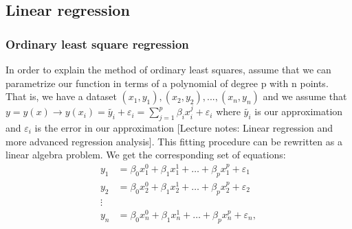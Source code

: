 \documentclass[a4paper,12pt]{article}
\begin{document}
\subsection{Linear regression}

\subsubsection{Ordinary least square regression}
In order to explain the method of ordinary least squares, assume that we can parametrize our function in terms of a polynomial of degree p with n points. That is, we have a dataset $(x_1, y_1), (x_2, y_2),..., (x_n, y_n)$ and we assume that $y = y(x) \rightarrow y(x_i) = \tilde{y_i} + \varepsilon_i = \sum_{j=1}^p{\beta_i x_i^j} + \varepsilon_i$ where $\tilde{y_i}$ is our approximation and $\varepsilon_i$ is the error in our approximation [Lecture notes: Linear regression and more advanced regression analysis].\newline
This fitting procedure can be rewritten as a linear algebra problem. We get the corresponding set of equations: 
\begin{align*}
y_1&=\beta_0x_1^0+\beta_1x_1^1+\hdots+\beta_px_1^p+\varepsilon_1\\
y_2&=\beta_0x_2^0+\beta_1x_2^1+\hdots+\beta_px_2^p+\varepsilon_2\\
\vdots\\
y_n&=\beta_0x_n^0+\beta_1x_n^1+\hdots+\beta_px_n^p+\varepsilon_n,
\end{align*}
\end{document}
